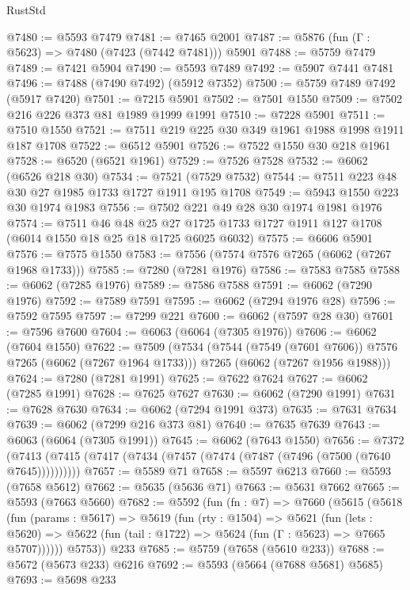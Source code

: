 \begin{lexlean}{RustStd}
\begin{coremodule}
@7480 := @5593 @7479
@7481 := @7465 @2001
@7487 := @5876 (fun (Γ : @5623) => @7480 (@7423 (@7442 @7481))) @5901
@7488 := @5759 @7479
@7489 := @7421 @5904
@7490 := @5593 @7489
@7492 := @5907 @7441 @7481
@7496 := @7488 (@7490 @7492) (@5912 @7352)
@7500 := @5759 @7489 @7492 (@5917 @7420)
@7501 := @7215 @5901
@7502 := @7501 @1550
@7509 := @7502 @216 @226 @373 @81 @1989 @1999 @1991
@7510 := @7228 @5901
@7511 := @7510 @1550
@7521 := @7511 @219 @225 @30 @349 @1961 @1988 @1998 @1911 @187 @1708
@7522 := @6512 @5901
@7526 := @7522 @1550 @30 @218 @1961
@7528 := @6520 (@6521 @1961)
@7529 := @7526 @7528
@7532 := @6062 (@6526 @218 @30)
@7534 := @7521 (@7529 @7532)
@7544 := @7511 @223 @48 @30 @27 @1985 @1733 @1727 @1911 @195 @1708
@7549 := @5943 @1550 @223 @30 @1974 @1983
@7556 := @7502 @221 @49 @28 @30 @1974 @1981 @1976
@7574 := @7511
    @46
    @48
    @25
    @27
    @1725
    @1733
    @1727
    @1911
    @127
    @1708
    (@6014 @1550 @18 @25 @18 @1725 @6025 @6032)
@7575 := @6606 @5901
@7576 := @7575 @1550
@7583 := @7556 (@7574 @7576 @7265 (@6062 (@7267 @1968 @1733)))
@7585 := @7280 (@7281 @1976)
@7586 := @7583 @7585
@7588 := @6062 (@7285 @1976)
@7589 := @7586 @7588
@7591 := @6062 (@7290 @1976)
@7592 := @7589 @7591
@7595 := @6062 (@7294 @1976 @28)
@7596 := @7592 @7595
@7597 := @7299 @221
@7600 := @6062 (@7597 @28 @30)
@7601 := @7596 @7600
@7604 := @6063 (@6064 (@7305 @1976))
@7606 := @6062 (@7604 @1550)
@7622 := @7509
    (@7534
      (@7544 (@7549 (@7601 @7606)) @7576 @7265 (@6062 (@7267 @1964 @1733)))
      @7265
      (@6062 (@7267 @1956 @1988)))
@7624 := @7280 (@7281 @1991)
@7625 := @7622 @7624
@7627 := @6062 (@7285 @1991)
@7628 := @7625 @7627
@7630 := @6062 (@7290 @1991)
@7631 := @7628 @7630
@7634 := @6062 (@7294 @1991 @373)
@7635 := @7631 @7634
@7639 := @6062 (@7299 @216 @373 @81)
@7640 := @7635 @7639
@7643 := @6063 (@6064 (@7305 @1991))
@7645 := @6062 (@7643 @1550)
@7656 := @7372 (@7413 (@7415 (@7417 (@7434 (@7457 (@7474 (@7487 (@7496 (@7500 (@7640 @7645))))))))))
@7657 := @5589 @71
@7658 := @5597 @6213
@7660 := @5593 (@7658 @5612)
@7662 := @5635 (@5636 @71)
@7663 := @5631 @7662
@7665 := @5593 (@7663 @5660)
@7682 := @5592
    (fun (fn : @7) =>
    @7660
      (@5615
        (@5618
          (fun (params : @5617) =>
          @5619
            (fun (rty : @1504) =>
            @5621
              (fun (lets : @5620) =>
              @5622 (fun (tail : @1722) => @5624 (fun (Γ : @5623) => @7665 @5707))))))
        @5753))
    @233
@7685 := @5759 (@7658 (@5610 @233))
@7688 := @5672 (@5673 @233) @6216
@7692 := @5593 (@5664 (@7688 @5681) @5685)
@7693 := @5698 @233

\end{coremodule}
\end{lexlean}
